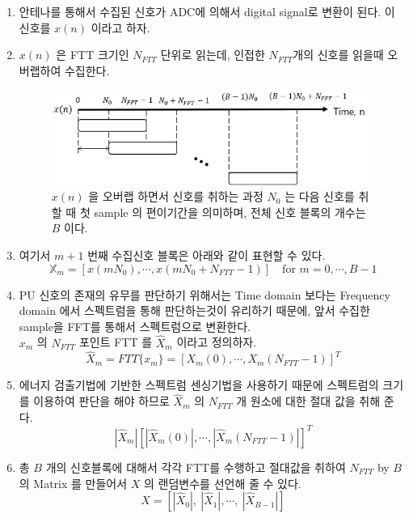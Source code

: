     \begin{enumerate}
        \item 안테나를 통해서 수집된 신호가 ADC에 의해서 digital signal로 변환이 된다. 이 신호를 $x(n)$ 이라고 하자.
        \item$x(n)$ 은 FTT 크기인 $N_{FTT}$ 단위로 읽는데, 인접한 $N_{FTT}$개의 신호를 읽을때 오버랩하여 수집한다.\\
            \vspace{-4mm}
            \begin{figure}[!h]\centering
    		\includegraphics[width=.65\textwidth]{image/week04/4-3.png}
    		\caption{\small$x(n)$ 을 오버랩 하면서 신호를 취하는 과정 \newline
                $N_0$ 는 다음 신호를 취할 때 첫 sample 의 편이기간을 의미하며, 전체 신호 블록의 개수는 $B$ 이다.  }
    		\vspace{-10pt}
            \end{figure}
        \clearpage
        \item 여기서 $m+1$ 번째 수집신호 블록은 아래와 같이 표현할 수 있다.
            $$
            \mathbb{X}_m = \left [{x}(mN_0), \cdots, x(mN_0 + N_{FTT} -1)
            \right] \quad \text{for } m=0,\cdots,B-1
            $$
        \item PU 신호의 존재의 유무를 판단하기 위해서는 Time domain 보다는 Frequency domain 에서 스펙트럼을 통해 판단하는것이 유리하기 때문에, 앞서 수집한 sample을 FFT를 통해서 스펙트럼으로 변환한다.\\
        $x_m$ 의 $N_{FTT}$ 포인트 FTT 를 $\hat{X}_m$ 이라고 정의하자.
            $$
            \hat{X}_m = FTT\{x_m\} = [X_m(0), \cdots,X_m(N_{FTT} -1)]^T
            $$
        \item 에너지 검출기법에 기반한 스펙트럼 센싱기법을 사용하기 때문에  스펙트럼의 크기를 이용하여 판단을 해야 하므로 $\hat{X}_m$ 의 $N_{FTT}$ 개 원소에 대한 절대 값을 취해 준다. 
            $$
            |\hat{X}_m| \left [
            |\hat{X}_m(0)|, \cdots, |\hat{X}_m(N_{FTT} -1)|
            \right ]^{T
            }
            $$
        \item 총 $B$ 개의 신호블록에 대해서 각각 FTT를 수행하고 절대값을 취하여 $N_{FTT}$ by $B$ 의 Matrix 를 만들어서 $X$ 의 랜덤변수를 선언해 줄 수 있다. 
            $$
            X = \left [
            |\hat{X}_0|,\ |\hat{X}_1|, \cdots ,\ |\hat{X}_{B-1}| 
            \right ]
            $$
    \end{enumerate}
